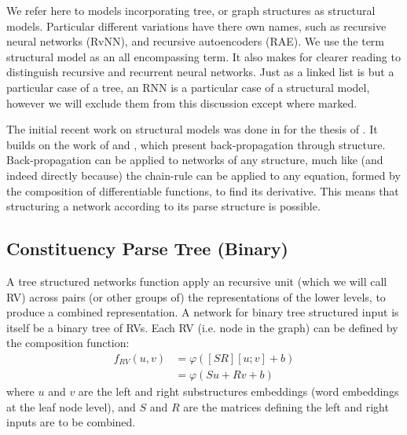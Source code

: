 \documentclass[12pt,parskip]{komatufte}
\begin{document}


We refer here to models incorporating tree, or graph structures as structural models.
Particular different variations have there own names, such as recursive neural networks (RvNN), and recursive autoencoders (RAE).
We use the term structural model as an all encompassing term. 
It also makes for clearer reading to distinguish recursive and recurrent  neural networks.
Just as a linked list is but a particular case of a tree, an RNN is a particular case of a structural model,
however we will exclude them from this discussion except where marked.


The initial recent work on structural models was done in for the thesis of .
It builds on the work of  and , which present back-propagation through structure.
Back-propagation can be applied to networks of any structure, much like (and indeed directly because) the chain-rule can be applied to any equation, formed by the composition of differentiable functions, to find its derivative.
This means that structuring a network according to its parse structure is possible.

\subsection{Constituency Parse Tree (Binary)}
A tree structured networks function apply an recursive unit (which we will call RV) across pairs (or other groups of) the representations of the lower levels, to produce a combined representation.
A network for binary tree structured input is itself be a binary tree of RVs.
Each RV (i.e. node in the graph) can be defined by the composition function:
\begin{align}
	f_{RV}(u, v) &= \varphi\left( [S R][u;v] + b \right) \\ \label{equ:rnn1}
			     &= \varphi\left( Su +Rv + b \right)
\end{align}
where $u$ and $v$ are the left and right substructures embeddings (word embeddings at the leaf node level), and $S$ and $R$ are the matrices defining the left and right inputs are to be combined.
\end{document}
